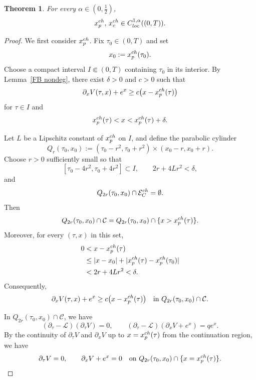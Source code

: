 \documentclass[10pt,a4paper]{amsart}
\newtheorem{theorem}{Theorem}
\begin{document}
\begin{theorem}\label{C1alpha free boundary}
For every $\alpha\in(0,\frac12)$,
\[
    x_p^{\rm ch},\,x_c^{\rm ch}
    \in C_{\rm loc}^{1,\alpha}((0,T)).
\]
\end{theorem}

\begin{proof}
We first consider $x_p^{\rm ch}$.
Fix $\tau_0\in(0,T)$ and set
\[
    x_0:=x_p^{\rm ch}(\tau_0).
\]
Choose a compact interval $I\Subset(0,T)$ containing $\tau_0$ in its
interior. By Lemma~\ref{FB nondeg}, there exist $\delta>0$ and $c>0$
such that
\[
    \partial_xV(\tau,x)+e^x
    \geq
    c\bigl(x-x_p^{\rm ch}(\tau)\bigr)
\]
for $\tau\in I$ and
\[
    x_p^{\rm ch}(\tau)
    <x<
    x_p^{\rm ch}(\tau)+\delta.
\]

Let $L$ be a Lipschitz constant of $x_p^{\rm ch}$ on $I$, and define
the parabolic cylinder
\[
    Q_r(\tau_0,x_0)
    :=
    (\tau_0-r^2,\tau_0+r^2)
    \times(x_0-r,x_0+r).
\]
Choose $r>0$ sufficiently small so that
\[
    [\tau_0-4r^2,\tau_0+4r^2]\subset I,
    \qquad
    2r+4Lr^2<\delta,
\]
and
\[
    Q_{2r}(\tau_0,x_0)\cap\mathcal E_C^{\rm ch}
    =\emptyset.
\]
Then
\[
    Q_{2r}(\tau_0,x_0)\cap\mathcal C
    =
    Q_{2r}(\tau_0,x_0)
    \cap
    \{x>x_p^{\rm ch}(\tau)\}.
\]
Moreover, for every $(\tau,x)$ in this set,
\[
\begin{aligned}
    0
    &<
    x-x_p^{\rm ch}(\tau) \\
    &\leq
    |x-x_0|
    +
    |x_p^{\rm ch}(\tau)-x_p^{\rm ch}(\tau_0)| \\
    &<
    2r+4Lr^2
    <\delta.
\end{aligned}
\]
Consequently,
\[
    \partial_xV(\tau,x)+e^x
    \geq
    c\bigl(x-x_p^{\rm ch}(\tau)\bigr)
    \quad\text{in }
    Q_{2r}(\tau_0,x_0)\cap\mathcal C.
\]

In $Q_{2r}(\tau_0,x_0)\cap\mathcal C$, we have
\[
    (\partial_\tau-\mathcal L)(\partial_\tau V)=0,
    \qquad
    (\partial_\tau-\mathcal L)(\partial_xV+e^x)=qe^x.
\]
By the continuity of $\partial_\tau V$ and $\partial_xV$ up to
$x=x_p^{\rm ch}(\tau)$ from the continuation region, we have
\[
    \partial_\tau V=0,
    \qquad
    \partial_xV+e^x=0
    \quad\text{on }
    Q_{2r}(\tau_0,x_0)
    \cap\{x=x_p^{\rm ch}(\tau)\}.
\]


\end{proof}
\end{document}
